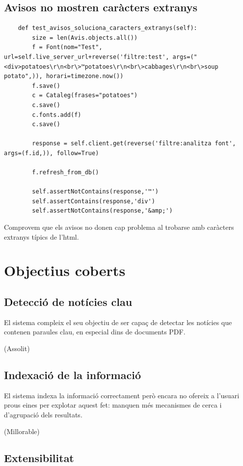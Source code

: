 \documentclass{article}
\begin{document}
\subsection{Avisos no mostren caràcters extranys}

\begin{lstlisting}
    def test_avisos_soluciona_caracters_extranys(self):
        size = len(Avis.objects.all())
        f = Font(nom="Test", url=self.live_server_url+reverse('filtre:test', args=("<div>potatoes\r\n<br\>™potatoes\r\n<br\>cabbages\r\n<br\>soup potato",)), horari=timezone.now())
        f.save()
        c = Cataleg(frases="potatoes")
        c.save()
        c.fonts.add(f)
        c.save()

        response = self.client.get(reverse('filtre:analitza font', args=(f.id,)), follow=True)

        f.refresh_from_db()

        self.assertNotContains(response,'™')
        self.assertContains(response,'div')
        self.assertNotContains(response,'&amp;')
\end{lstlisting}

Comprovem que els avisos no donen cap problema al trobarse amb caràcters extranys típics de l'html.

\newpage

\section{Objectius coberts}

\subsection{Detecció de notícies clau}

El sistema compleix el seu objectiu de ser capaç de detectar les notícies que contenen paraules clau, en especial dins de documents PDF.

(Assolit)

\subsection{Indexació de la informació}

El sistema indexa la informació correctament però encara no ofereix a l'usuari prous eines per explotar aquest fet: manquen més mecanismes de cerca i d'agrupació dels resultats.

(Millorable)

\subsection{Extensibilitat}
\end{document}
